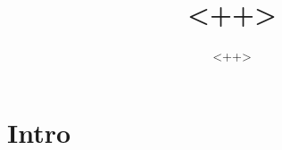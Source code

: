 \documentclass[a4paper, oneside]{article} %
\title{<++>}
\author{<++>}
\begin{document}
\maketitle

\section{Intro}
\end{document}
